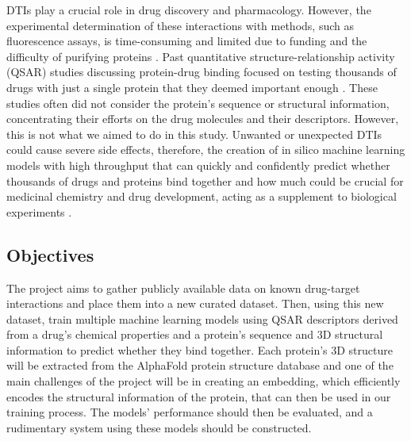DTIs play a crucial role in drug discovery and pharmacology. However, the experimental determination of these interactions with methods, such as fluorescence assays, is time-consuming and limited due to funding and the difficulty of purifying proteins \citep{Shar2016, Wang2020}. Past quantitative structure-relationship activity (QSAR) studies discussing protein-drug binding focused on testing thousands of drugs with just a single protein that they deemed important enough \citep{Colmenarejo2003, Vallianatou2013}. These studies often did not consider the protein's sequence or structural information, concentrating their efforts on the drug molecules and their descriptors. However, this is not what we aimed to do in this study. Unwanted or unexpected DTIs could cause severe side effects, therefore, the creation of in silico machine learning models with high throughput that can quickly and confidently predict whether thousands of drugs and proteins bind together and how much could be crucial for medicinal chemistry and drug development, acting as a supplement to biological experiments \citep{Shar2016, Wang2020}.

\subsection{Objectives}
\label{subsec:Objectives}

The project aims to gather publicly available data on known drug-target interactions and place them into a new curated dataset. Then, using this new dataset, train multiple machine learning models using QSAR descriptors derived from a drug's chemical properties and a protein's sequence and 3D structural information to predict whether they bind together. Each protein's 3D structure will be extracted from the AlphaFold protein structure database \citep{Jumper2021, Varadi2022} and one of the main challenges of the project will be in creating an embedding, which efficiently encodes the structural information of the protein, that can then be used in our training process. The models' performance should then be evaluated, and a rudimentary system using these models should be constructed.

\hspace{1cm}
